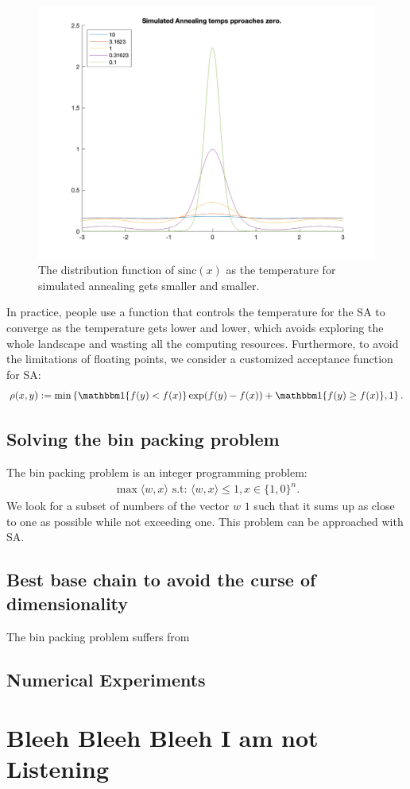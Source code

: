 \documentclass[]{article}
\theoremstyle{definition}
\begin{document}
        \begin{figure}[H]
            \centering 
            \includegraphics[width=14cm]{sa_temp.png}
            \caption{The distribution function of $\text{sinc}(x)$ as the temperature for simulated annealing gets smaller and smaller.}
            \label{fig:sa_temp}
        \end{figure}
        In practice, people use a function that controls the temperature for the SA to converge as the temperature gets lower and lower, which avoids exploring the whole landscape and wasting all the computing resources. Furthermore, to avoid the limitations of floating points, we consider a customized acceptance function for SA: 
        \begin{align*}
            \rho(x, y) := \min
            \left\lbrace
            \mathbbm 1 \{f(y) < f(x)\}\exp(f(y) - f(x)) + \mathbbm 1 \{f(y) \ge f(x)\}, 1
            \right\rbrace. 
        \end{align*}
\subsection{Solving the bin packing problem}
    The bin packing problem is an integer programming problem: 
    \begin{align*}
        \max \langle w, x\rangle \text{ s.t: } \langle w, x\rangle \le 1, x\in \{1, 0\}^n. 
    \end{align*}
    We look for a subset of numbers of the vector $w$ $1$ such that it sums up as close to one as possible while not exceeding one. This problem can be approached with SA. 
    \subsection{Best base chain to avoid the curse of dimensionality}
        The bin packing problem suffers from 
    \subsection{Numerical Experiments}

\appendix
\section{Bleeh Bleeh Bleeh I am not Listening}



\end{document}
